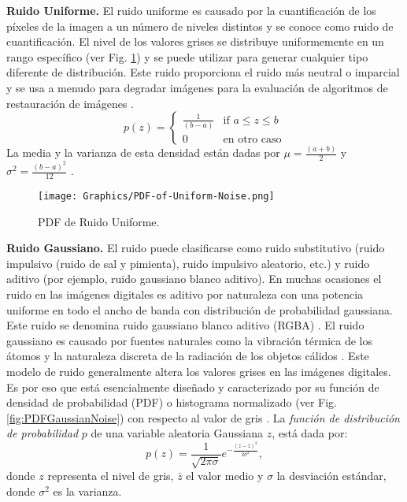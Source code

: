 \textbf{Ruido Uniforme.}
El ruido uniforme es causado por la cuantificación de los píxeles de la imagen a un número de niveles distintos y se conoce como ruido de cuantificación. El nivel de los valores grises se distribuye uniformemente en un rango específico (ver Fig. \ref{fig:PDFUniformNoise}) y se puede utilizar para generar cualquier tipo diferente de distribución. Este ruido proporciona el ruido más neutral o imparcial y se usa a menudo para degradar imágenes para la evaluación de algoritmos de restauración de imágenes \cite{HaidiTheamSin}.
$$
p(z) = \left\{
    \begin{array}{ll}
        \frac{1}{(b-a)} & \mbox{if } a \leq z \leq b \\
        0  & \mbox{en otro caso}
    \end{array}
    \right.
$$
La media y la varianza de esta densidad están dadas por $\mu = \frac{(a+b)}{2}$ y $\sigma^2 = \frac{(b-a)^2}{12}$ \cite{MandarMeghana}.\\
    
\begin{figure}[h!]
    \centering
    \texttt{[image: Graphics/PDF-of-Uniform-Noise.png]}
    \caption{PDF de Ruido Uniforme.}
    \label{fig:PDFUniformNoise}
\end{figure}

\textbf{Ruido Gaussiano.}
El ruido puede clasificarse como ruido substitutivo (ruido impulsivo (ruido de sal y pimienta), ruido impulsivo aleatorio, etc.) y ruido aditivo (por ejemplo, ruido gaussiano blanco aditivo). En muchas ocasiones el ruido en las imágenes digitales es aditivo por naturaleza con una potencia uniforme en todo el ancho de banda con distribución de probabilidad gaussiana. Este ruido se denomina ruido gaussiano blanco aditivo (RGBA) \cite{MandarMeghana}. El ruido gaussiano es causado por fuentes naturales como la vibración térmica de los átomos y la naturaleza discreta de la radiación de los objetos cálidos \cite{AjayBrijendra2}. Este modelo de ruido generalmente altera los valores grises en las imágenes digitales. Es por eso que está esencialmente diseñado y caracterizado por su función de densidad de probabilidad (PDF) o histograma normalizado (ver Fig. \ref{fig:PDFGaussianNoise}) con respecto al valor de gris \cite{AjayBrijendra}. La \textit{función de distribución de probabilidad} $p$ de una variable aleatoria Gaussiana $z$, está dada por:
$$p(z) = \frac{1}{\sqrt{2\pi\sigma}}e^{-\frac{(z-\bar{z})^2}{2\sigma^2}},$$
donde $z$ representa el nivel de gris, $\bar{z}$ el valor medio y $\sigma$ la desviación estándar, donde $\sigma^2$ es la varianza.

